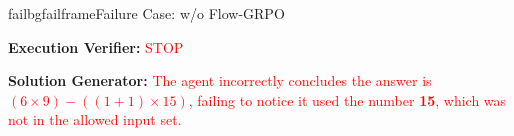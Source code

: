 \begin{small}
\begin{center}
\begin{casebox}{failbg}{failframe}{Failure Case: \model w/o Flow-GRPO}
    \vspace{1em}

    \textbf{Execution Verifier:} \textcolor{red}{STOP}

    \vspace{1em}

    \textbf{Solution Generator: } \textcolor{red}{The agent incorrectly concludes the answer is $(6 \times 9) - ((1 + 1) \times 15)$, failing to notice it used the number \textbf{15}, which was not in the allowed input set.}
\end{casebox}


\end{center}
\end{small}

